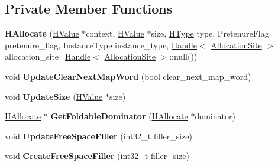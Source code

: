\subsection*{Private Member Functions}
\begin{DoxyCompactItemize}
\item 
{\bfseries H\+Allocate} (\hyperlink{classv8_1_1internal_1_1_h_value}{H\+Value} $\ast$context, \hyperlink{classv8_1_1internal_1_1_h_value}{H\+Value} $\ast$size, \hyperlink{classv8_1_1internal_1_1_h_type}{H\+Type} type, Pretenure\+Flag pretenure\+\_\+flag, Instance\+Type instance\+\_\+type, \hyperlink{classv8_1_1internal_1_1_handle}{Handle}$<$ \hyperlink{classv8_1_1internal_1_1_allocation_site}{Allocation\+Site} $>$ allocation\+\_\+site=\hyperlink{classv8_1_1internal_1_1_handle}{Handle}$<$ \hyperlink{classv8_1_1internal_1_1_allocation_site}{Allocation\+Site} $>$\+::null())\hypertarget{classv8_1_1internal_1_1_h_allocate_ab2d5b09eb7e44ee0de8a756de9e3f270}{}\label{classv8_1_1internal_1_1_h_allocate_ab2d5b09eb7e44ee0de8a756de9e3f270}

\item 
void {\bfseries Update\+Clear\+Next\+Map\+Word} (bool clear\+\_\+next\+\_\+map\+\_\+word)\hypertarget{classv8_1_1internal_1_1_h_allocate_a5cc5ce3c3a232815de0e48c3ca60e919}{}\label{classv8_1_1internal_1_1_h_allocate_a5cc5ce3c3a232815de0e48c3ca60e919}

\item 
void {\bfseries Update\+Size} (\hyperlink{classv8_1_1internal_1_1_h_value}{H\+Value} $\ast$size)\hypertarget{classv8_1_1internal_1_1_h_allocate_aad1695a378df7dd4995a7814260569aa}{}\label{classv8_1_1internal_1_1_h_allocate_aad1695a378df7dd4995a7814260569aa}

\item 
\hyperlink{classv8_1_1internal_1_1_h_allocate}{H\+Allocate} $\ast$ {\bfseries Get\+Foldable\+Dominator} (\hyperlink{classv8_1_1internal_1_1_h_allocate}{H\+Allocate} $\ast$dominator)\hypertarget{classv8_1_1internal_1_1_h_allocate_aefbff8936837e1acf0a538102e467388}{}\label{classv8_1_1internal_1_1_h_allocate_aefbff8936837e1acf0a538102e467388}

\item 
void {\bfseries Update\+Free\+Space\+Filler} (int32\+\_\+t filler\+\_\+size)\hypertarget{classv8_1_1internal_1_1_h_allocate_acdb2cdac2bba2f3880d5a623b787add5}{}\label{classv8_1_1internal_1_1_h_allocate_acdb2cdac2bba2f3880d5a623b787add5}

\item 
void {\bfseries Create\+Free\+Space\+Filler} (int32\+\_\+t filler\+\_\+size)\hypertarget{classv8_1_1internal_1_1_h_allocate_ab7d2e7a3ed51115041e8f54b48491bdf}{}\label{classv8_1_1internal_1_1_h_allocate_ab7d2e7a3ed51115041e8f54b48491bdf}


\end{DoxyCompactItemize}
